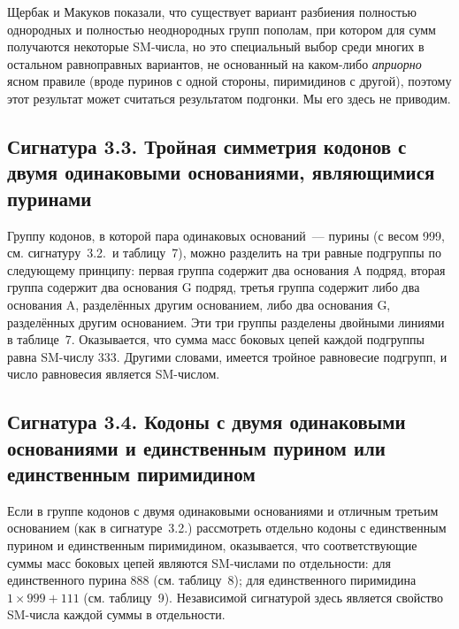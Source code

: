 \documentclass[12pt]{article}
\begin{document}
Щербак и Макуков показали, что существует вариант разбиения полностью однородных и полностью неоднородных групп пополам, при котором для сумм получаются некоторые SM-числа, но это специальный выбор среди многих в остальном равноправных вариантов, не основанный на каком-либо \textit{априорно} ясном правиле (вроде пуринов с одной стороны, пиримидинов с другой), поэтому этот результат может считаться результатом подгонки. Мы его здесь не приводим.


\subsection*{Сигнатура 3.3. Тройная симметрия кодонов с двумя одинаковыми основаниями, являющимися пуринами}

Группу кодонов, в которой пара одинаковых оснований~--- пурины (с весом 999, см. сигнатуру~3.2.\ и таблицу~7), можно разделить на три равные подгруппы по следующему принципу: первая группа содержит два основания A подряд, вторая группа содержит два основания G подряд, третья группа содержит либо два основания A, разделённых другим основанием, либо два основания G, разделённых другим основанием. Эти три группы разделены двойными линиями в таблице~7. Оказывается, что сумма масс боковых цепей каждой подгруппы равна SM-числу 333. Другими словами, имеется тройное равновесие подгрупп, и число равновесия является SM-числом.


\subsection*{Сигнатура 3.4. Кодоны с двумя одинаковыми основаниями и единственным пурином или единственным пиримидином}

Если в группе кодонов с двумя одинаковыми основаниями и отличным третьим основанием (как в сигнатуре~3.2.) рассмотреть отдельно кодоны с единственным пурином и единственным пиримидином, оказывается, что соответствующие суммы масс боковых цепей являются SM-числами по отдельности: для единственного пурина 888 (см. таблицу~8); для единственного пиримидина $1 \times 999 + 111$ (см. таблицу~9). Независимой сигнатурой здесь является свойство SM-числа каждой суммы в отдельности.
\end{document}
